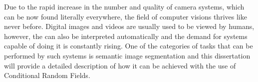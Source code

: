 Due to the rapid increase in the number and quality of camera systems, which can be now found literally everywhere, the field of computer visions thrives like never before. Digital images and videos are usually used to be viewed by humans, however, the can also be interpreted automatically and the demand for systems capable of doing it is constantly rising. One of the categories of tasks that can be performed by such systems is semantic image segmentation and this dissertation will provide a detailed description of how it can be achieved with the use of Conditional Random Fields.